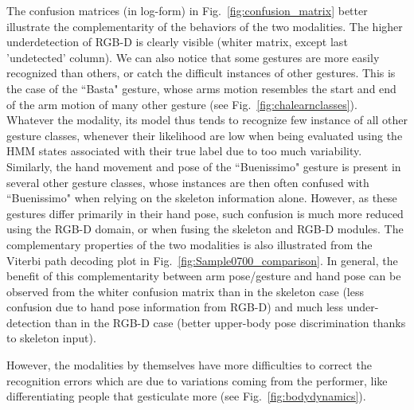 %
The confusion matrices (in log-form)
 in Fig.~\ref{fig:confusion_matrix} better illustrate the complementarity of the behaviors of the two modalities.
%
The higher underdetection of RGB-D is clearly visible (whiter matrix, except last 'undetected' column).
%
We can also notice that some gestures are more easily recognized than others,
or catch the difficult instances of other gestures.
This is the case  of the ``Basta" gesture,
whose arms motion  resembles the  start and end of the arm motion of many other gesture (see Fig.~\ref{fig:chalearnclasses}).
Whatever the modality, its model thus tends to recognize few instance of all other gesture classes, whenever their
likelihood are low when being evaluated using the HMM states associated with their true label
due to too much variability.
%
Similarly, the hand movement and pose of the ``Buenissimo" gesture is present in several other gesture classes,
whose instances are then often confused with ``Buenissimo" when relying on the skeleton information alone.
%
However, as these gestures differ primarily in their hand pose, such confusion is much more reduced using the RGB-D domain,
or when fusing  the skeleton and RGB-D modules.
%
The complementary properties of the two modalities is also illustrated from the Viterbi path decoding plot in Fig.~\ref{fig:Sample0700_comparison}.
In general, the benefit of this complementarity between arm pose/gesture and hand pose
can be observed from the whiter confusion matrix than in the skeleton case (less confusion due to hand pose information from RGB-D)
and much less under-detection than in the RGB-D case (better upper-body pose discrimination thanks to skeleton input).
%

However, the modalities by themselves have more difficulties to correct the recognition errors which are due to variations coming from the performer,
like differentiating  people that gesticulate more (see Fig.~\ref{fig:bodydynamics}).

